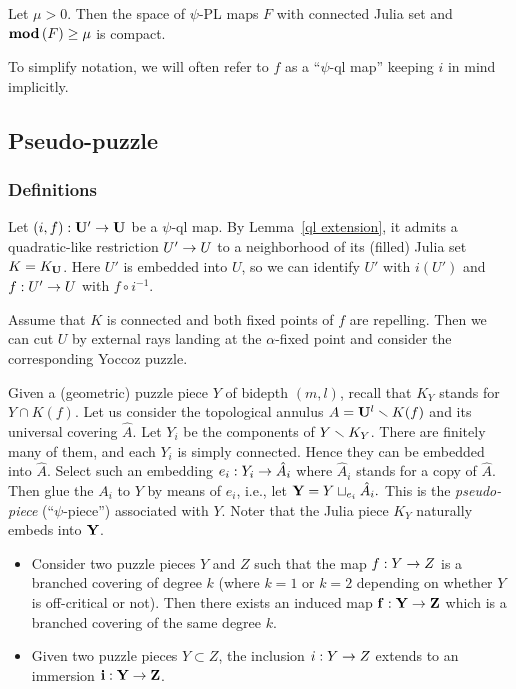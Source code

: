 \begin{lem}\label{compactness}
  Let $\mu>0$. Then the space of $\psi$-PL maps $F$ with connected  Julia set
and  ${ \mathbf{mod}\, }(F)\geq \mu$ is compact.
\end{lem}  

To simplify notation, we will often refer to $f$ as a ``$\psi$-ql map'' 
keeping $i$ in mind implicitly. 


\subsection{Pseudo-puzzle}\label{psi-puzzle}

\subsubsection{Definitions}
   Let $(i,f) : {\mathbf{U}}'\rightarrow {\mathbf{U}}$ be a $\psi$-ql map.
By Lemma~\ref{ql extension}, it admits a quadratic-like restriction $U'\rightarrow U$ to a neighborhood of
its (filled) Julia set  $K=K_{\mathbf{U}}$.
Here $U'$ is embedded into $U$, so we can identify $U'$ with $i(U')$
and $ f: U'\rightarrow U $ with  $f \circ i^{-1} $. 

Assume that $K$ is connected and both fixed points of $f$ are repelling.
Then we can cut $U$ by external rays landing at the $\alpha$-fixed point and consider the corresponding Yoccoz puzzle.

Given a (geometric) puzzle piece $Y$ of bidepth $(m,l)$,
recall that $K_Y$ stands for $Y\cap K(f)$. %
Let us consider the topological annulus $A={\mathbf{U}}^l  \smallsetminus K(f)$ and its universal covering $\hat A$. 
Let $Y_i$ be the components of $Y\smallsetminus K_Y$. There are finitely many of them,
and each $Y_i$ is simply connected. Hence they can be embedded into $\hat A$.
Select such an embedding $e_i: Y_i\rightarrow \hat A_i$ where $\hat A_i$ stands for a copy of $\hat A$. 
Then glue the $A_i$ to $Y$ by means of $e_i$, i.e., let ${\mathbf{Y}}= Y \sqcup_{e_i} \hat A_i.$
This is  the {\it pseudo-piece} (``$\psi$-piece'') associated with $Y$.
Noter that the Julia piece $K_Y$ naturally embeds into ${\mathbf{Y}}$.

\begin{lem}\label{psi-maps}
\begin{itemize}
\item [(i)]  Consider two puzzle pieces $Y$ and $Z$ such that the map $f: Y\rightarrow Z$ is a branched covering
of degree $k$ (where $k=1$ or $k=2$ depending on whether $Y$ is off-critical or not).
Then there exists an induced map ${\bf f}: {\mathbf{Y}} \rightarrow {\mathbf{Z}}$
which  is a branched covering of the same degree $k$.  


\item [(ii)] Given two puzzle pieces $Y\subset Z$, the inclusion $i: Y\rightarrow Z$ extends to an immersion ${\mathbf{ i}}: {\mathbf{Y}}\rightarrow {\mathbf{Z}}$.
\end{itemize}
\end{lem}

